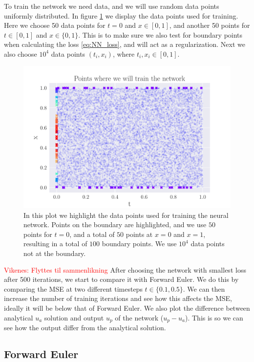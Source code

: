 \documentclass[12pt]{extarticle}
\begin{document}
To train the network we need data, and we will use random data points uniformly distributed. In figure \ref{fig:NN_training_points} we display the data points used for training. Here we choose 50 data points for $t=0$ and $x\in[0,1]$, and another 50 points for $t\in[0,1]$ and $x\in\{0,1\}$. This is to make sure we also test for boundary points when calculating the loss \eqref{eq:NN_loss}, and will act as a regularization. Next we also choose $10^4$ data points $(t_i, x_i)$, where $t_i,x_i\in[0,1]$. 
\begin{figure}[h]
	\centering
	\includegraphics[width=\linewidth]{../output/plots/training_points.pdf}
	\caption{In this plot we highlight the data points used for training the neural network. Points on the boundary are highlighted, and we use $50$ points for $t=0$, and a total of $50$ points at $x=0$ and $x=1$, resulting in a total of $100$ boundary points. We use $10^4$ data points not at the boundary.} \label{fig:NN_training_points}
\end{figure}

\textcolor{red}{Vikenes: Flyttes til sammenlikning}
After choosing the network with smallest loss after 500 iterations, we start to compare it with Forward Euler. We do this by comparing the MSE at two different timesteps $t\in\{0.1, 0.5\}$. We can then increase the number of training iterations and see how this affects the MSE, ideally it will be below that of Forward Euler. We also plot the difference between analytical $u_a$ solution and output $u_p$ of the network ($u_p - u_a$). This is so we can see how the output differ from the analytical solution.

\subsection{Forward Euler}
\end{document}
